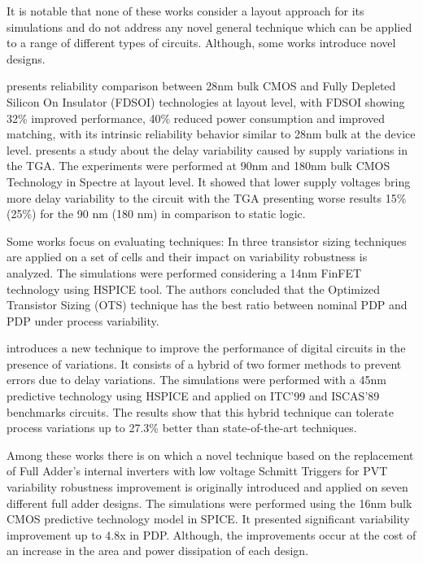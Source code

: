 \documentclass[ecp,tc, english]{iiufrgs}
\begin{document}
It is notable that none of these works consider a layout approach for its simulations and do not address any novel general technique which can be applied to a range of different types of circuits. Although, some works introduce novel designs.

\cite{federspiel201228nm} presents reliability comparison between 28nm bulk CMOS and Fully Depleted Silicon On Insulator (FDSOI) technologies at layout level, with FDSOI showing 32\% improved performance, 40\% reduced power consumption and improved matching, with its intrinsic reliability behavior similar to 28nm bulk at the device level. \cite{alioto2007delay} presents a study about the delay variability caused by supply variations in the TGA. The experiments were performed at 90nm and 180nm bulk CMOS Technology in Spectre at layout level. It showed that lower supply voltages bring more delay variability to the circuit with the TGA presenting worse results 15\% (25\%) for the 90 nm (180 nm) in comparison to static logic.

Some works focus on evaluating techniques: In \cite{zimpeck2016finfet} three transistor sizing techniques are applied on a set of cells and their impact on variability robustness is analyzed. The simulations were performed considering a 14nm FinFET technology using HSPICE tool. The authors concluded that the Optimized Transistor Sizing (OTS) technique has the best ratio between nominal PDP and PDP under process variability.

\cite{ahmadi2017hybrid} introduces a new technique to improve the performance of digital circuits in the presence of variations. It consists of a hybrid of two former methods to prevent errors due to delay variations. The simulations were performed with a 45nm predictive technology using HSPICE and applied on ITC’99 and ISCAS’89 benchmarks circuits. The results show that this hybrid technique can tolerate process variations up to 27.3\% better than state-of-the-art techniques.

Among these works there is \cite{dokania2015circuit} on which a novel technique based on the replacement of Full Adder’s internal inverters with low voltage Schmitt Triggers for PVT variability robustness improvement is originally introduced and applied on seven different full adder designs. The simulations were performed using the 16nm bulk CMOS predictive technology model in SPICE. It presented significant variability improvement up to 4.8x in PDP. Although, the improvements occur at the cost of an increase in the area and power dissipation of each design.  
\end{document}
